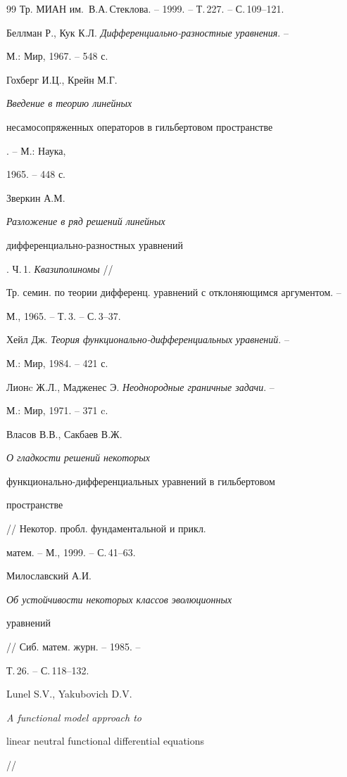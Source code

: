 \begin{thebibliography}{99}
Тр. МИАН им.~В.А.\,Стеклова. -- 1999. -- Т.\,227. -- С.\,109--121. 




Беллман Р., Кук К.Л. {\em Дифференциально-разностные уравнения}. -- 


М.: Мир, 1967. -- 548 с. 




Гохберг И.Ц., Крейн М.Г. {\em Введение в теорию линейных 


несамосопряженных операторов в гильбертовом пространстве}. -- М.: Наука, 


1965. -- 448 с. 




Зверкин А.М. {\em Разложение в ряд решений линейных 


дифференциально-разностных уравнений}. Ч.\,1. {\em Квазиполиномы} // 


Тр. семин. по теории дифференц. уравнений с отклоняющимся аргументом. -- 


М., 1965. -- Т.\,3. -- С.\,3--37. 




Хейл Дж. {\em Теория функционально-дифференциальных уравнений}. -- 


М.: Мир, 1984. -- 421 с. 




Лионc Ж.Л., Мадженес Э. {\em Неоднородные граничные задачи}. -- 


М.: Мир, 1971. -- 371 c. 




Власов В.В., Сакбаев В.Ж. {\em О гладкости решений некоторых 


функционально-диф\-фе\-рен\-ци\-аль\-ных уравнений в гильбертовом


пространстве} // Некотор. пробл. фундаментальной и прикл.


матем. -- М., 1999. -- С.\,41--63. 




Милославский А.И. {\em Об устойчивости некоторых классов эволюционных 


уравнений} // Сиб. матем. журн. -- 1985. -- 


Т.\,26. -- С.\,118--132. 




Lunel S.V., Yakubovich D.V. {\em A functional model approach to 


linear neutral functional differential equations} // 



\end{thebibliography}
